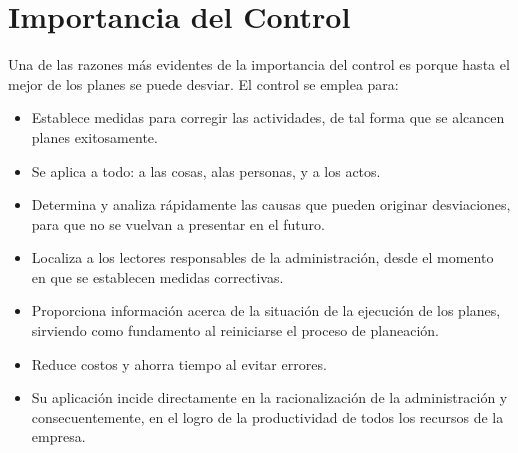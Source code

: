 \documentclass[12pt,letterpaper]{article}
\begin{document}
\section{Importancia del Control}
Una de las razones más evidentes de la importancia del control es porque hasta el mejor de los planes se puede desviar. El control se emplea para:
\begin{itemize}

\item Establece medidas para corregir las actividades, de tal forma que se alcancen planes exitosamente.
\item Se aplica a todo: a las cosas, alas personas, y a los actos.
\item Determina y analiza rápidamente las causas que pueden originar desviaciones, para que no se vuelvan a presentar en el futuro.
\item Localiza a los lectores responsables de la administración, desde el momento en que se establecen medidas correctivas.
\item Proporciona información acerca de la situación de la ejecución de los planes, sirviendo como fundamento al reiniciarse el proceso de planeación.
\item Reduce costos y ahorra tiempo al evitar errores.
\item Su aplicación incide directamente en la racionalización de la administración y consecuentemente, en el logro de la productividad de todos los recursos de la empresa.
\end{itemize}
\end{document}
